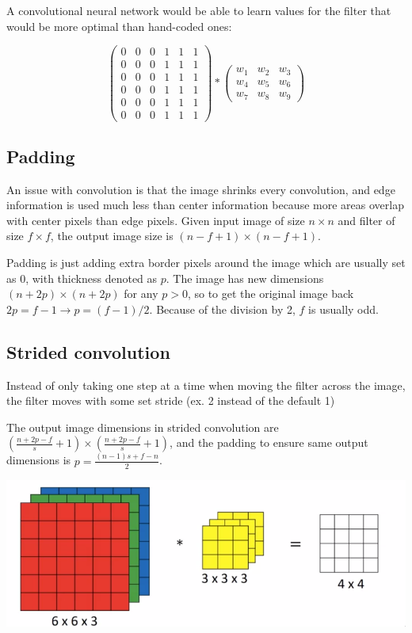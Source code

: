 \documentclass[12pt]{article}
\begin{document}
A convolutional neural network would be able to learn values for the filter that would be
more optimal than hand-coded ones:

\[
    \begin{pmatrix}
        0 & 0 & 0 & 1 & 1 & 1\\
        0 & 0 & 0 & 1 & 1 & 1\\
        0 & 0 & 0 & 1 & 1 & 1\\
        0 & 0 & 0 & 1 & 1 & 1\\
        0 & 0 & 0 & 1 & 1 & 1\\
        0 & 0 & 0 & 1 & 1 & 1
    \end{pmatrix}
    *
    \begin{pmatrix}
        w_1 & w_2 & w_3\\
        w_4 & w_5 & w_6\\
        w_7 & w_8 & w_9
    \end{pmatrix}
\]

\subsection{Padding}

An issue with convolution is that the image shrinks every convolution, and edge information
is used much less than center information because more areas overlap with center
pixels than edge pixels. Given input image of size $n \times n$ and filter of size $f
\times f$, the output image size is $(n-f+1) \times (n-f+1)$.

Padding is just adding extra border pixels around the image which are usually
set as 0, with thickness denoted as $p$. The image has new dimensions $(n + 2p) \times
(n + 2p)$ for any $p > 0$, so to get the original image back $2p = f - 1 \rightarrow p = (f-1)/2$.
Because of the division by 2, $f$ is usually odd.

\subsection{Strided convolution}

Instead of only taking one step at a time when moving the filter across the image, the filter
moves with some set stride (ex. 2 instead of the default 1)

The output image dimensions in strided convolution are
$(\frac{n+2p-f}{s}+1) \times (\frac{n+2p-f}{s}+1)$, and the padding to ensure
same output dimensions is $p = \frac{(n-1)s+f-n}{2}$.

\includegraphics[scale=.5]{images/cnn-filter-volume.png}
\end{document}
